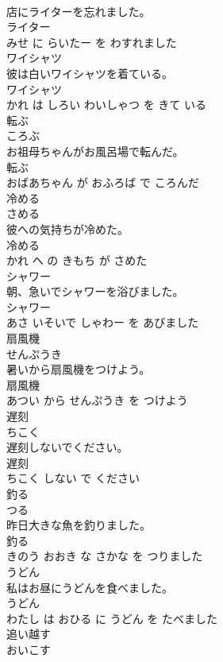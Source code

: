 \documentclass[8pt]{extreport}
\begin{document}
\begin{CJK}{UTF8}{min}
\\	店にライターを忘れました。	
\\	ライター 
\\	みせ に らいたー を わすれました			
\\	ワイシャツ	
\\	彼は白いワイシャツを着ている。	
\\	ワイシャツ 
\\	かれ は しろい わいしゃつ を きて いる			
\\	転ぶ	
\\	ころぶ			
\\	お祖母ちゃんがお風呂場で転んだ。	
\\	転ぶ 
\\	おばあちゃん が おふろば で ころんだ			
\\	冷める	
\\	さめる			
\\	彼への気持ちが冷めた。	
\\	冷める 
\\	かれ へ の きもち が さめた			
\\	シャワー	
\\	朝、急いでシャワーを浴びました。	
\\	シャワー 
\\	あさ いそいで しゃわー を あびました			
\\	扇風機	
\\	せんぷうき			
\\	暑いから扇風機をつけよう。	
\\	扇風機 
\\	あつい から せんぷうき を つけよう			
\\	遅刻	
\\	ちこく			
\\	遅刻しないでください。	
\\	遅刻 
\\	ちこく しない で ください			
\\	釣る	
\\	つる			
\\	昨日大きな魚を釣りました。	
\\	釣る 
\\	きのう おおき な さかな を つりました			
\\	うどん	
\\	私はお昼にうどんを食べました。	
\\	うどん 
\\	わたし は おひる に うどん を たべました			
\\	追い越す	
\\	おいこす			

\end{CJK}
\end{document}
